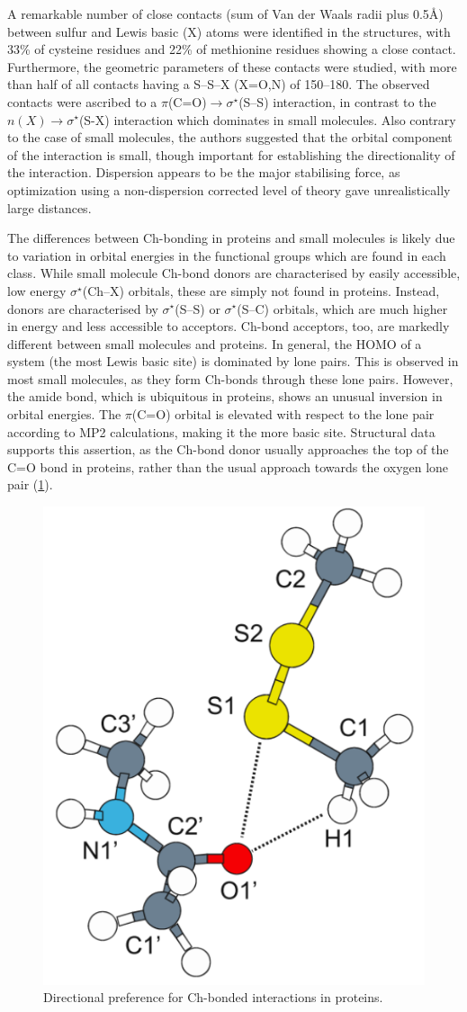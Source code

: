 \begin{refsection}
A remarkable number of close contacts (sum of Van der Waals radii plus 0.5\AA) between sulfur and Lewis basic (X) atoms were identified in the structures, with 33\% of cysteine residues and 22\% of methionine residues showing a close contact.
Furthermore, the geometric parameters of these contacts were studied, with more than half of all contacts having a S--S--X (X=O,N) of 150--180\degree.
The observed contacts were ascribed to a $\pi$(C=O)$\rightarrow \sigma^{\star}$(S--S) interaction, in contrast to the $n(X) \rightarrow \sigma^{\star}$(S-X) interaction which dominates in small molecules.
Also contrary to the case of small molecules, the authors suggested that the orbital component of the interaction is small, though important for establishing the directionality of the interaction.
Dispersion appears to be the major stabilising force, as optimization using a non-dispersion corrected level of theory gave unrealistically large distances.

The differences between Ch-bonding in proteins and small molecules is likely due to variation in orbital energies in the functional groups which are found in each class.
While small molecule Ch-bond donors are characterised by easily accessible, low energy $\sigma^{\star}$(Ch--X) orbitals, these are simply not found in proteins.
Instead, donors are characterised by $\sigma^{\star}$(S--S) or $\sigma^{\star}$(S--C) orbitals, which are much higher in energy and less accessible to acceptors.
Ch-bond acceptors, too, are markedly different between small molecules and proteins.
In general, the HOMO of a system (the most Lewis basic site) is dominated by lone pairs.
This is observed in most small molecules, as they form Ch-bonds through these lone pairs.
However, the amide bond, which is ubiquitous in proteins, shows an unusual inversion in orbital energies.
The $\pi$(C=O) orbital is elevated with respect to the lone pair according to MP2 calculations, making it the more basic site.
Structural data supports this assertion, as the Ch-bond donor usually approaches the top of the C=O bond in proteins, rather than the usual approach towards the oxygen lone pair (\cref{fig:amide-diselenide-ch-bond}).\autocite{Iwaoka2012}

\begin{figure}
    \centering
    \includegraphics[width=0.4\linewidth]{Figures/amide-diselenide-ch-bond.pdf}
    \caption{Directional preference for Ch-bonded interactions in proteins.}
    \label{fig:amide-diselenide-ch-bond}
\end{figure}


\end{refsection}
